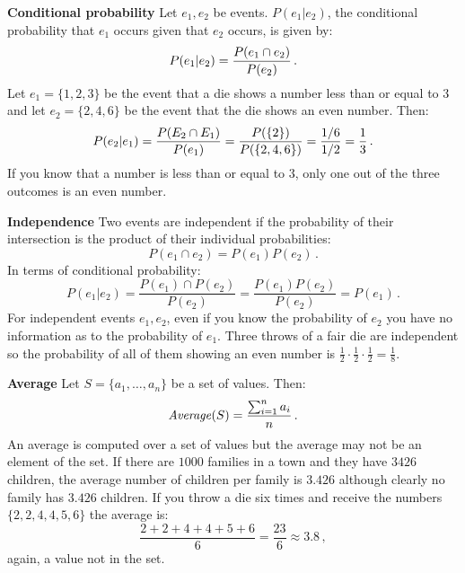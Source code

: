 \textbf{Conditional probability} Let $e_1,e_2$ be events.  $P(e_1 | e_2)$, the conditional probability that $e_1$ occurs given that $e_2$ occurs, is given by:
\[
P(e_1 | e_2) = \displaystyle\frac{P(e_1 \cap e_2)}{P(e_2)}\,.
\]
Let $e_1=\{1,2,3\}$ be the event that a die shows a number less than or equal to $3$ and let $e_2=\{2,4,6\}$ be the event that the die shows an even number. Then:
\[
P(e_2 | e_1) = \displaystyle\frac{P(E_2 \cap E_1)}{P(e_1)}=\displaystyle\frac{P(\{2\})}{P(\{2,4,6\})}= \displaystyle\frac{1/6}{1/2}=\displaystyle\frac{1}{3}\,.
\]
If you know that a number is less than or equal to $3$, only one out of the three outcomes is an even number.

\textbf{Independence} Two events are independent if the probability of their intersection is the product of their individual probabilities:
\[
P(e_1 \cap e_2)=P(e_1)P(e_2)\,.
\]
In terms of conditional probability:
\[
P(e_1 | e_2)=\frac{P(e_1)\cap P(e_2)}{P(e_2)} = \frac{P(e_1)P(e_2)}{P(e_2)}=P(e_1)\,. 
\]
For independent events $e_1,e_2$, even if you know the probability of $e_2$ you have no information as to the probability of $e_1$. Three throws of a fair die are independent so the probability of all of them showing an even number is $\frac{1}{2}\cdot \frac{1}{2}\cdot \frac{1}{2}=\frac{1}{8}$. 

\textbf{Average}
Let $S=\{a_1,\ldots,a_n\}$ be a set of values. Then:
\[
\mathit{Average}(S)=\displaystyle\frac{\sum_{i=1}^{n} a_i}{n}\,.
\]
An average is computed over a set of values but the average may not be an element of the set. If there are $1000$ families in a town and they have $3426$ children, the average number of children per family is $3.426$ although clearly no family has $3.426$ children. If you throw a die six times and receive the numbers $\{2,2,4,4,5,6\}$ the average is:
\[
\frac{2+2+4+4+5+6}{6}=\frac{23}{6}\approx 3.8\,,
\]
again, a value not in the set.

